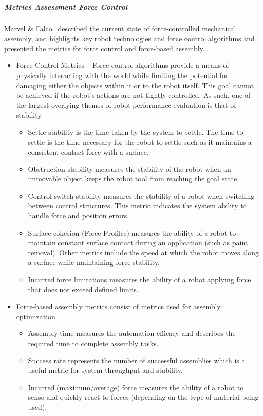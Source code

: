 \subparagraph{Metrics Assessment Force Control --}
Marvel \& Falco~\cite{Marvel.NISTIR.2012} described the current state of force-controlled mechanical assembly, and highlights key robot technologies and force control algorithms and presented the metrics for force control and force-based assembly.
\begin{itemize}
\item Force Control Metrics -- Force control algorithms provide a means of physically interacting with the world while limiting the potential for damaging either the objects within it or to the robot itself. This goal cannot be achieved if the robot's actions are not tightly controlled. As such, one of the largest overlying themes of robot performance evaluation is that of stability. 
\begin{itemize}
\item Settle stability is the time taken by the system to settle. The time to settle is the time necessary for the robot to settle such as it maintains a consistent contact force with a surface.
\item Obstruction stability measures the stability of the robot when an immovable object keeps the robot tool from reaching the goal state.
\item Control switch stability measures the stability of a robot when switching between control structures. This metric indicates the system ability to handle force and position errors.
\item Surface cohesion (Force Profiles) measures the ability of a robot to maintain constant surface contact during an application (such as paint removal). Other metrics include the speed at which the robot moves along a surface while maintaining force stability.
    \item Incurred force limitations measures the ability of a robot applying force that does not exceed defined limits.
\end{itemize}
\item Force-based assembly metrics consist of metrics used for assembly optimization.
\begin{itemize}
\item Assembly time measures the automation efficacy and describes the required time to complete assembly tasks.
\item Success rate represents the number of successful assemblies which is a useful metric for system throughput and stability.
\item Incurred (maximum/average) force measures the ability of a robot to sense and quickly react to forces (depending on the type of material being used).
\end{itemize}
\end{itemize}
%
%
%

